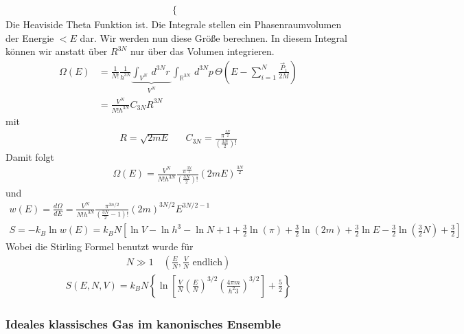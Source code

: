\documentclass[11pt]{article}
\theoremstyle{plain}
\theoremstyle{mytheoremstyle}
\newcommand{\R}{\mathbb{R}}
\renewcommand{\d}[1]{\,d#1\,}
\begin{document}
\begin{description}
\begin{align*}
\begin{cases}
        \end{cases}
      \end{align*}
      Die Heaviside Theta Funktion ist.
      Die Integrale stellen ein Phasenraumvolumen der Energie $< E $ dar.
      Wir werden nun diese Gr\"o\ss{}e berechnen. In diesem Integral k\"onnen
      wir anstatt \"uber $R^{3N}$ nur \"uber das Volumen integrieren.
      \begin{align*}
        \Omega(E) & = \frac{1}{N!} \frac{1}{h^{3N}} \underbrace{\int_{V^N}^{} \d{^{3N} r}}_{V^N}
        \int_{\R^{3N}}^{} \d{^{3N} p} \Theta(E-\sum_{i=1}^{N} \frac{\vec{P}_1}{2M}) \\
        & = \frac{V^N}{ N! h^{3N}} C_{3N} R ^{3N}
      \end{align*}
      mit %
      \begin{align*}
        R = \sqrt{2 m E} && C_{3N} = \frac{\pi^\frac{3N}{2}}{(\frac{3N}{2})!}
      \end{align*}
      Damit folgt
      \begin{align*}
        \Omega(E) = \frac{V^N}{N! h^{3N}} \frac{\pi^\frac{3N}{2}}{(\frac{3N}{2})!}
        (2mE)^\frac{3N}{2}
      \end{align*}
      und 
      \begin{align*}
        w(E) = \frac{d\Omega}{dE} = \frac{V^N}{N! h^{3N}} \frac{\pi^{3 n / 2}}{
        (\frac{3N}{2} - 1)!} (2 m )^{3 N / 2} E ^{ 3 N /2 - 1} \\
        S = - k_B \ln{w(E)} = k_B N \left[ \ln{V} - \ln{h^3} - \ln{N}
        + 1 + \frac{3}{2} \ln{(\pi) } + \frac{3}{2} \ln{(2m)} + \frac{3}{2} \ln{E}
      - \frac{3}{2} \ln{(\frac{3}{2} N)} + \frac{3}{2}\right]
      \end{align*}
      Wobei die Stirling Formel benutzt wurde f\"ur
      \begin{align*}
        N \gg 1 \quad \left(\frac{E}{N}, \frac{V}{N} \text{ endlich}\right)
      \end{align*}
      \begin{align*}
        S(E, N, V) = k_B N \left\{  \ln{ \left[ 
              \frac{V}{N} \left( \frac{E}{N} \right)^{3 / 2} \left( 
        \frac{4 \pi m }{ h^2 3}\right)^{3 / 2} \right] } + \frac{5}{2} \right\}
      \end{align*}
      
\end{description}
\subsubsection*{Ideales klassisches Gas im kanonisches Ensemble}
\end{document}
